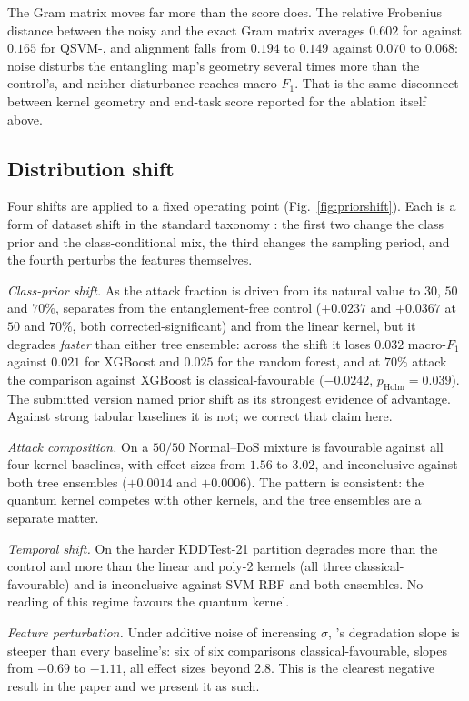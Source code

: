 \begin{revbody}
The Gram matrix moves far more than the score does. The relative Frobenius
distance between the noisy and the exact Gram matrix averages $0.602$ for
\QSVM{} against $0.165$ for QSVM-\Zmap{}, and alignment falls from
$0.194$ to $0.149$ against $0.070$ to $0.068$: noise disturbs the entangling
map's geometry several times more than the control's, and neither disturbance
reaches macro-$F_1$. That is the same disconnect between kernel geometry and
end-task score reported for the ablation itself above.
\end{revbody}

\subsection{Distribution shift}
\label{sec:res-c3}

\begin{revbody}


Four shifts are applied to a fixed operating point (Fig.~\ref{fig:priorshift}).
Each is a form of dataset shift in the standard taxonomy \cite{ref33}: the first
two change the class prior and the class-conditional mix, the third changes the
sampling period, and the fourth perturbs the features themselves.

\emph{Class-prior shift.} As the attack fraction is driven from its natural
value to $30$, $50$ and $70\%$, \QSVM{} separates from the entanglement-free
control ($+0.0237$ and $+0.0367$ at $50$ and $70\%$, both corrected-significant)
and from the linear kernel, but it degrades \emph{faster} than either tree
ensemble: across the shift it loses $0.032$ macro-$F_1$ against $0.021$ for
XGBoost and $0.025$ for the random forest, and at $70\%$ attack the comparison
against XGBoost is classical-favourable ($-0.0242$, $p_{\text{Holm}}=0.039$).
The submitted version named prior shift as its strongest evidence of advantage.
Against strong tabular baselines it is not; we correct that claim here.

\emph{Attack composition.} On a $50/50$ Normal--DoS mixture \QSVM{} is
favourable against all four kernel baselines, with effect sizes from $1.56$ to
$3.02$, and inconclusive against both tree ensembles ($+0.0014$ and $+0.0006$).
The pattern is consistent: the quantum kernel competes with other kernels, and
the tree ensembles are a separate matter.

\emph{Temporal shift.} On the harder KDDTest-21 partition \QSVM{} degrades more
than the control and more than the linear and poly-2 kernels (all three
classical-favourable) and is inconclusive against SVM-RBF and both ensembles.
No reading of this regime favours the quantum kernel.

\emph{Feature perturbation.} Under additive noise of increasing $\sigma$,
\QSVM{}'s degradation slope is steeper than every baseline's: six of six
comparisons classical-favourable, slopes from $-0.69$ to $-1.11$, all effect
sizes beyond $2.8$. This is the clearest negative result in the paper and we
present it as such.
\end{revbody}

